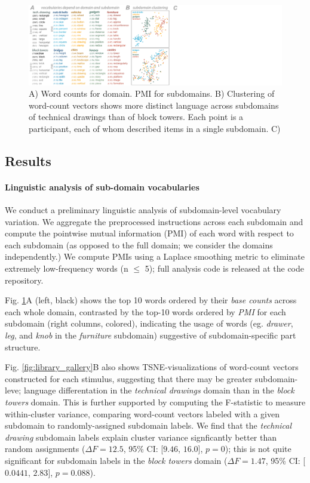 \documentclass[10pt,letterpaper]{article}
\begin{document}
\begin{figure}[!ht]
  \begin{center}
  \includegraphics[width=1.0\linewidth]{figures/lax_vocabularies.pdf}
  \caption{A) Word counts for domain. PMI for subdomains. B) Clustering of word-count vectors shows more distinct language across subdomains of technical drawings than of block towers. Each point is a participant, each of whom described items in a single subdomain. C) }
  \label{fig:vocabulary_gallery}
  \end{center}
\end{figure}

\subsection{Results}
\paragraph{Linguistic analysis of sub-domain vocabularies} %
We conduct a preliminary linguistic analysis of subdomain-level vocabulary variation. We aggregate the preprocessed instructions across each subdomain and compute the pointwise mutual information (PMI) of each word with respect to each subdomain (as opposed to the full domain; we consider the domains independently.) We compute PMIs using a Laplace smoothing metric to eliminate extremely low-frequency words (n $\leq$ 5); full analysis code is released at the code repository.

Fig. \ref{fig:vocabulary_gallery}A (left, black) shows the top 10 words ordered by their \textit{base counts} across each whole domain, contrasted by the top-10 words ordered by \textit{PMI} for each subdomain (right columns, colored), indicating the usage of words (eg. \textit{drawer}, \textit{leg}, and \textit{knob} in the \textit{furniture} subdomain) suggestive of subdomain-specific part structure. 

Fig. \ref{fig:library_gallery}B also shows TSNE-visualizations of word-count vectors constructed for each stimulus, suggesting that there may be greater subdomain-leve; language differentation in the \textit{technical drawings} domain than in the \textit{block towers} domain. This is further supported by computing the F-statistic to measure within-cluster variance, comparing word-count vectors labeled with a given subdomain to randomly-assigned subdomain labels. We find that the \textit{technical drawing} subdomain labels explain cluster variance signficantly better than random assignments ($\Delta F = 12.5$, 95\% CI: [$9.46$, $16.0$], $p=0$); this is not quite significant for subdomain labels in the \textit{block towers} domain ($\Delta F = 1.47$, 95\% CI: [$0.0441$, $2.83$], $p=0.088$).
\end{document}
